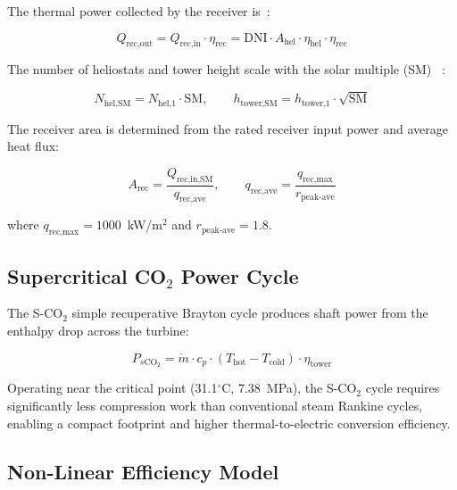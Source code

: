 \documentclass[journal]{IEEEtran}
\begin{document}
The thermal power collected by the receiver is~\cite{liu2022}:

\begin{equation}
Q_{\text{rec,out}} = Q_{\text{rec,in}} \cdot \eta_{\text{rec}} = \text{DNI} \cdot A_{\text{hel}} \cdot \eta_{\text{hel}} \cdot \eta_{\text{rec}}
\label{eq:rec}
\end{equation}

The number of heliostats and tower height scale with the solar multiple (SM) ~\cite{liu2022}:

\begin{equation}
N_{\text{hel,SM}} = N_{\text{hel,1}} \cdot \text{SM}, \qquad h_{\text{tower,SM}} = h_{\text{tower,1}} \cdot \sqrt{\text{SM}}
\label{eq:sm}
\end{equation}

The receiver area is determined from the rated receiver input power and average heat flux:

\begin{equation}
A_{\text{rec}} = \frac{Q_{\text{rec,in,SM}}}{q_{\text{rec,ave}}}, \qquad q_{\text{rec,ave}} = \frac{q_{\text{rec,max}}}{r_{\text{peak-ave}}}
\label{eq:arec}
\end{equation}

where $q_{\text{rec,max}} = 1000$~kW/m$^2$ and $r_{\text{peak-ave}} = 1.8$.

\subsection{Supercritical CO$_2$ Power Cycle}

The S-CO$_2$ simple recuperative Brayton cycle produces shaft power from the enthalpy drop across the turbine:

\begin{equation}
P_{s\text{CO}_2} = \dot{m} \cdot c_p \cdot (T_{\text{hot}} - T_{\text{cold}}) \cdot \eta_{\text{tower}}
\label{eq:sco2}
\end{equation}

Operating near the critical point (31.1$^\circ$C, 7.38~MPa), the S-CO$_2$ cycle requires significantly less compression work than conventional steam Rankine cycles, enabling a compact footprint and higher thermal-to-electric conversion efficiency.

\subsection{Non-Linear Efficiency Model}
\end{document}

